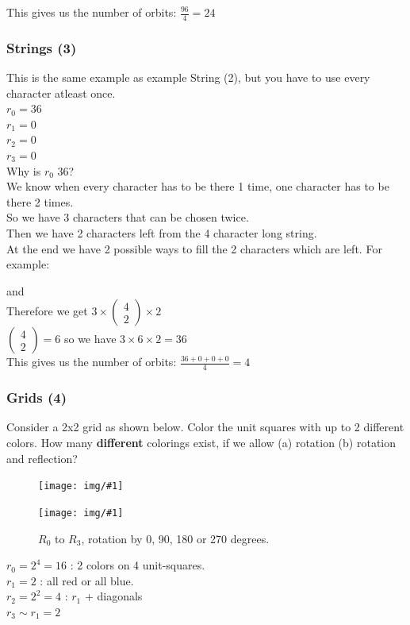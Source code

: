 \documentclass[12pt,onecolumn%
]{scrartcl}
\newcommand{\img}[3]{
\begin{figure}[H]
	\centering
	\texttt{[image: img/\#1]}
	\captionsetup{width=0.8\textwidth, justification=centering}
	\caption{#3}
\end{figure}
}
\newcommand{\imgnc}[2]{
\begin{figure}[H]
	\centering
	\texttt{[image: img/\#1]}
	\captionsetup{width=0.8\textwidth, justification=centering}
\end{figure}
}
\newcommand{\st}[4]{
\boxed{\text{#1}}\boxed{\text{#2}}\boxed{\text{#3}}\boxed{\text{#4}}
}
\begin{document}
{This gives us the number of orbits: $\frac{96}{4} = 24$

\subsubsection{Strings (3)}
This is the same example as example String (2), but you have to use every character atleast once. \\
$r_{0} = 36$\\
$r_{1} = 0$\\
$r_{2} = 0$\\
$r_{3} = 0$\\

Why is $r_0$ 36?\\
We know when every character has to be there 1 time, one character has to be there 2 times.\\
So we have 3 characters that can be chosen twice.\\
Then we have 2 characters left from the 4 character long string. \\
At the end we have 2 possible ways to fill the 2 characters which are left. For example:
\st{B}{A}{C}{A} and \st{C}{A}{B}{A} \\

Therefore we get $3 \times\begin{pmatrix}4\\2\end{pmatrix}\times 2$ \\
$\begin{pmatrix}4\\2\end{pmatrix} = 6$ so we have $3 \times 6 \times 2 = 36$\\

This gives us the number of orbits: $\frac{36+0+0+0}{4} = 4$

\subsubsection{Grids (4)}

Consider a 2x2 grid as shown below. Color the unit squares with up to 2 different colors. How many {\bf different} colorings exist, if we allow (a) rotation (b) rotation and reflection?

\imgnc{block_2x2}{trim=140 610 400 120, clip}

\img{block_2x2_rot}{scale=1.1,trim=140 350 335 125, clip}{$R_0$ to $R_3$, rotation by 0, 90, 180 or 270 degrees.}

$r_0 = 2^4 = 16$ : 2 colors on 4 unit-squares. \\
$r_1 = 2$ : all red or all blue. \\
$r_2 = 2^2 = 4$ : $r_1$ + diagonals \\
$r_3 \sim r_1 = 2$

}
\end{document}
